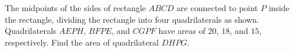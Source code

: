 The midpoints of the sides of rectangle $ABCD$ are connected to point $P$ inside the rectangle, dividing the rectangle into four quadrilaterals as shown. Quadrilaterals $AEPH$, $BFPE$, and $CGPF$ have areas of $20$, $18$, and $15$, respectively. Find the area of quadrilateral $DHPG$.
